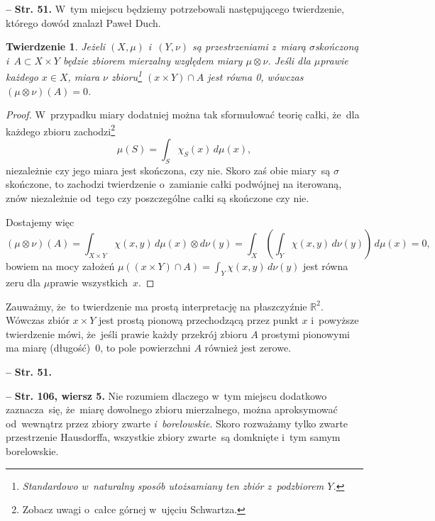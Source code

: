 \documentclass[a4paper,11pt]{article}
\newtheorem{twr}{Twierdzenie}
\newcommand{\spaceThree}{0.5em}
\newcommand{\mb}{\mathbb}
\newcommand{\si}{\sigma}
\newcommand{\R}{\mb{R}}
\newcommand{\sset}{\subset}
\newcommand{\ti}{\times}
\newcommand{\ot}{\otimes}
\newcommand{\tb}{\textbf}
\newcommand{\noi}{\noindent}
\newcommand{\start}{\noi \tb{--} {}}
\newcommand{\Str}[1]{\tb{Str. #1.}}
\newcommand{\StrWg}[2]{\tb{Str. #1, wiersz #2.}}
\begin{document}
\vspace{\spaceThree}


\start \Str{51} W~tym miejscu będziemy potrzebowali następującego
twierdzenie, którego dowód znalazł Paweł Duch.

\begin{twr}
  \label{twr:miaraA}
  Jeżeli $( X, \mu )$ i~$( Y, \nu )$ są przestrzeniami z~miarą
  $\si$\dywiz skończoną i~$A \sset X \ti Y$ będzie zbiorem mierzalny
  względem miary $\mu \ot \nu$. Jeśli dla $\mu$\dywiz prawie każdego
  $x \in X$, miara $\nu$ zbioru\footnote{Standardowo w~naturalny
    sposób utożsamiany ten zbiór z~podzbiorem $Y$.}
  $( x \ti Y ) \cap A$ jest równa 0, wówczas $(\mu \ot \nu)( A ) = 0$.
\end{twr}
\begin{proof}
  W~przypadku miary dodatniej można tak sformułować teorię całki,
  że~dla każdego zbioru zachodzi\footnote{Zobacz uwagi o~całce górnej
    w~ujęciu Schwartza.}
  \begin{equation*}
    \mu( S ) = \int_{ S } \chi_{ S }( x ) \, d\mu( x ),
  \end{equation*}
  niezależnie czy jego miara jest skończona, czy nie. Skoro zaś obie
  miary~są $\si$\dywiz skończone, to zachodzi twierdzenie o~zamianie
  całki podwójnej na iterowaną, znów niezależnie od~tego czy
  poszczególne całki są skończone czy nie.

  Dostajemy więc
  \begin{equation*}
    (\mu \ot \nu)( A ) = \int_{ X \ti Y } \chi( x, y )
    \, d\mu( x ) \ot d\nu( y )
    = \int_{ X } \left( \int_{ Y } \chi( x, y ) \, d\nu( y ) \right)
    \, d\mu( x ) = 0,
  \end{equation*}
  bowiem na mocy założeń
  $\mu( ( x \ti Y ) \cap A ) = \int_{ Y } \chi( x, y ) \, d\nu( y )$
  jest równa zeru dla $\mu$\dywiz prawie wszystkich~$x$.
\end{proof}
Zauważmy, że~to twierdzenie ma prostą interpretację na płaszczyźnie
$\R^{ 2 }$. Wówczas zbiór $x \ti Y$ jest prostą pionową przechodzącą
przez punkt $x$ i~powyższe twierdzenie mówi, że~jeśli prawie każdy
przekrój zbioru $A$ prostymi pionowymi ma miarę (długość)~0, to pole
powierzchni $A$ również jest zerowe.

\vspace{\spaceThree}


\start \Str{51}


\start \StrWg{106}{5} Nie rozumiem dlaczego w~tym miejscu dodatkowo
zaznacza~się, że~miarę dowolnego zbioru mierzalnego, można
aproksymować od~wewnątrz przez zbiory zwarte \emph{i~borelowskie}.
Skoro rozważamy tylko zwarte przestrzenie Hausdorffa, wszystkie zbiory
zwarte~są domknięte i~tym samym borelowskie.
\end{document}
